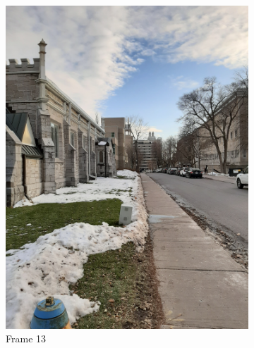 \documentclass[conference]{IEEEtran}
\begin{document}
\begin{figure}[!h]
\begin{subfigure}[b]{0.2\linewidth}
    \includegraphics[width=\linewidth, angle = -90]{images/frame13.jpg}
    \caption{Frame 13}
  \end{subfigure}
  \begin{subfigure}[b]{0.2\linewidth}

\end{subfigure}
\end{figure}
\end{document}
